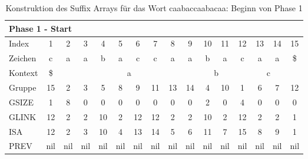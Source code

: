 \begin{table}[H]
\centering
\begin{adjustbox}{max width=\textwidth}
\begin{tabular}{lccccccccccccccc}
\multicolumn{16}{l}{Phase 1 - Start}                                                                                                                                                         \\ \hline
\multicolumn{1}{l|}{Index}   & 1                       & 2   & 3   & 4   & 5   & 6   & 7   & 8   & 9                       & 10  & 11                      & 12  & 13  & 14  & 15  \\
\multicolumn{1}{l|}{Zeichen} & c                       & a   & a   & b   & a   & c   & c   & a   & a                       & b   & a                       & c   & a   & a   & \$  \\ \cline{1-16}
\multicolumn{1}{l|}{Kontext} & \multicolumn{1}{c|}{\$} & \multicolumn{8}{c|}{a}                                            & \multicolumn{2}{c|}{b}        & \multicolumn{4}{c}{c} \\
\multicolumn{1}{l|}{Gruppe}      & \multicolumn{1}{c|}{15} & 2   & 3   & 5   & 8   & 9   & 11  & 13  & \multicolumn{1}{c|}{14} & 4   & \multicolumn{1}{c|}{10} & 1   & 6   & 7   & 12  \\
\multicolumn{1}{l|}{GSIZE}   & \multicolumn{1}{c|}{1}  & 8   & 0   & 0   & 0   & 0   & 0   & 0   & \multicolumn{1}{c|}{0}  & 2   & \multicolumn{1}{c|}{0}  & 4   & 0   & 0   & 0   \\
\multicolumn{1}{l|}{GLINK}   & 12                      & 2   & 2   & 10  & 2   & 12  & 12  & 2   & 2                       & 10  & 2                       & 12  & 2   & 2   & 1   \\
\multicolumn{1}{l|}{ISA}     & 12                      & 2   & 3   & 10  & 4   & 13  & 14  & 5   & 6                       & 11  & 7                       & 15  & 8   & 9   & 1   \\
\multicolumn{1}{l|}{PREV}    & nil                     & nil & nil & nil & nil & nil & nil & nil & nil                     & nil & nil                     & nil & nil & nil & nil
\end{tabular}
\end{adjustbox}

\caption[Konstruktion des Suffix Arrays für das Wort caabaccaabacaa: Beginn von Phase 1]{Konstruktion des Suffix Arrays für das Wort caabaccaabacaa: Beginn von Phase 1}
\label{table_complex_example_1_start} 
\end{table}

